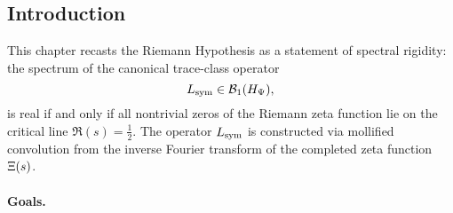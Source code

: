 \subsection*{Introduction}

This chapter recasts the Riemann Hypothesis as a statement of spectral rigidity: the spectrum of the canonical trace-class operator
\[
L_{\mathrm{sym}} \in \mathcal{B}_1(H_{\Psi}),
\]
is real if and only if all nontrivial zeros of the Riemann zeta function lie on the critical line \( \Re(s) = \tfrac{1}{2} \). The operator \( L_{\mathrm{sym}} \) is constructed via mollified convolution from the inverse Fourier transform of the completed zeta function \( \Xi(s) \).

\paragraph{Goals.}
